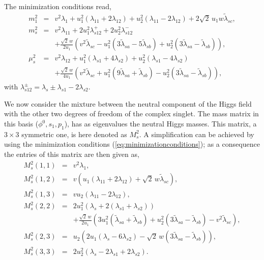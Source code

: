\documentclass[aps,prd,groupaddress,floatfix,tighten,nofootinbib,showpacs,
amsfonts,superscriptaddress]{revtex4}
\def\be{\begin{equation}}
\def\ee{\end{equation}}
\begin{document}
The minimization conditions read,
%
\begin{subequations}
\label{eq:minimizationconditions}
\begin{eqnarray}   
  m^2_1  &=&  v^2  \lambda_1 + u_1^2 (\lambda_{11} + 2\lambda_{12}) + u_2^2 (\lambda_{11} - 2\lambda_{12}) +2\sqrt{2} \, u_1 w \tilde{\lambda}_{sc},  \\ 
  m^2_{s}  &=& v^2 \lambda_{11} + 2 u_1^2 \lambda_{s12}^+ +2 u_2^2 \lambda_{s12}^- \\  \nonumber
 &&  + \frac{\sqrt{2}\, w}{2 u_1} \left(v^2 \tilde{\lambda}_{sc} - u_1^2 \left(3\tilde{\lambda}_{sa} - 5\tilde{\lambda}_{sb} \right) + u_2^2 \left(3\tilde{\lambda}_{sa} - \tilde{\lambda}_{sb} \right)  \right) , \\ \nonumber
{\mu}^2_{s} &=&   v^2 \lambda_{12} +  u_1^2 \left(\lambda_{s1} + 4 \lambda_{s2}\right) + u_2^2 \left(\lambda_{s1} - 4\lambda_{s2} \right) \\ \label{mincondition}
 &&  + \frac{\sqrt{2}\, w}{4 u_1} \left(v^2 \tilde{\lambda}_{sc} + u_1^2 \left(9\tilde{\lambda}_{sa} + \tilde{\lambda}_{sb} \right) - u_2^2 \left(3\tilde{\lambda}_{sa} - \tilde{\lambda}_{sb} \right)  \right)  ,
\end{eqnarray}
 \end{subequations}
with  $\lambda_{s12}^{\pm} = \lambda_s{\pm}\lambda_{s1} - 2 \lambda_{s2}$. 

 We now consider the mixture between the neutral component of the Higgs field with the other two degrees of freedom of the complex singlet.  The mass matrix in this basis ($\phi^0, s_1, p_1$), has as eigenvalues the neutral Higgs masses. This matrix, a $3 \times 3$ symmetric one, is here denoted as $M^2_s$. A simplification can be achieved by using the minimization conditions (\ref{eq:minimizationconditions}); as a consequence the entries of this matrix are then given as,
\be
\label{eq:massmatrix}
\begin{array}{rcl}
M^2_s(1,1) & = & v^2 \lambda_{1} ,   \\
M^2_s(1,2) & = & v\left(u_1(\lambda_{11} + 2 \lambda_{12}) + \sqrt{2} \, w\tilde{\lambda}_{sc}\right),    \\
M^2_s(1,3) & = & v u_2  (\lambda_{11} - 2 \lambda_{12}) ,   \\
M^2_s(2,2) & = & 2 u_1^2\left(\lambda_{s} + 2(\lambda_{s1}+\lambda_{s2})\right) \\
                   &     & +\displaystyle\frac{\sqrt{2}\, w}{2u_1} \left( 3u_1^2(\tilde{\lambda}_{sa} +  \tilde{\lambda}_{sb}) + u_2^2(3\tilde{\lambda}_{sa} -  \tilde{\lambda}_{sb}) - v^2 \tilde{\lambda}_{sc} \right) ,    \\
M^2_s(2,3) & = & u_2\left(2u_1(\lambda_s-6\lambda_{s2}) - \sqrt{2}\, w (3\tilde{\lambda}_{sa} -  \tilde{\lambda}_{sb})  \right),   \\
M^2_s(3,3) & = & 2u_2^2 (\lambda_s - 2\lambda_{s1} + 2 \lambda_{s2}).
\end{array}
\ee
%
\end{document}
